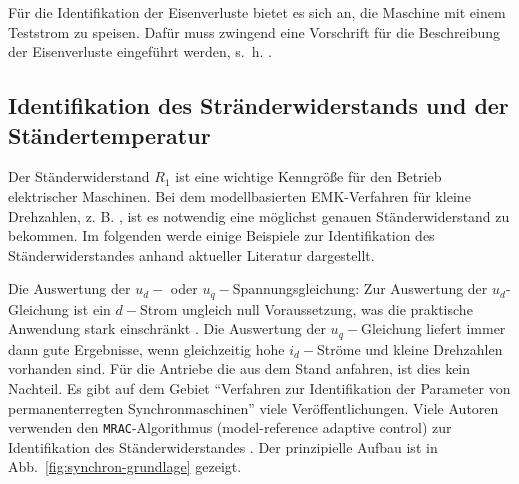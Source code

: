 \documentclass[conference,twocolumn]{IEEEtran}
\begin{document}
Für die Identifikation der Eisenverluste bietet es sich an, die Maschine mit einem Teststrom zu speisen.
Dafür muss zwingend eine Vorschrift für die Beschreibung der Eisenverluste eingeführt werden, s.~h. \autocite[S.~75]{Kellner2012}.

\subsection{Identifikation des Stränderwiderstands und der Ständertemperatur}\label{sec:sident}

Der Ständerwiderstand $R_1$ ist eine wichtige Kenngröße für den Betrieb elektrischer Maschinen.
Bei dem modellbasierten EMK-Verfahren für kleine Drehzahlen, z. B. \autocite{genduso}, ist es notwendig eine möglichst genauen Ständerwiderstand zu bekommen.
Im folgenden werde einige Beispiele zur Identifikation des Ständerwiderstandes anhand aktueller Literatur dargestellt.

Die Auswertung der $u_d-$ oder $u_q-$Spannungsgleichung: Zur Auswertung der $u_d$-Gleichung ist ein $d-$Strom ungleich null Voraussetzung, was die praktische Anwendung stark einschränkt \autocite{Kellner2012}.
Die Auswertung der $u_q-$Gleichung liefert immer dann gute Ergebnisse, wenn gleichzeitig hohe $i_d-$Ströme und kleine Drehzahlen vorhanden sind.
Für die Antriebe die aus dem Stand anfahren, ist dies kein Nachteil.
Es gibt auf dem Gebiet \enquote{Verfahren zur Identifikation der Parameter von permanenterregten Synchronmaschinen} viele Veröffentlichungen.
Viele Autoren verwenden den \texttt{MRAC}-Algorithmus (model-reference adaptive control) zur Identifikation des Ständerwiderstandes \autocite{slotine_applied_1991}.
Der prinzipielle Aufbau ist in Abb.~\ref{fig:synchron-grundlage} gezeigt.


\end{document}
